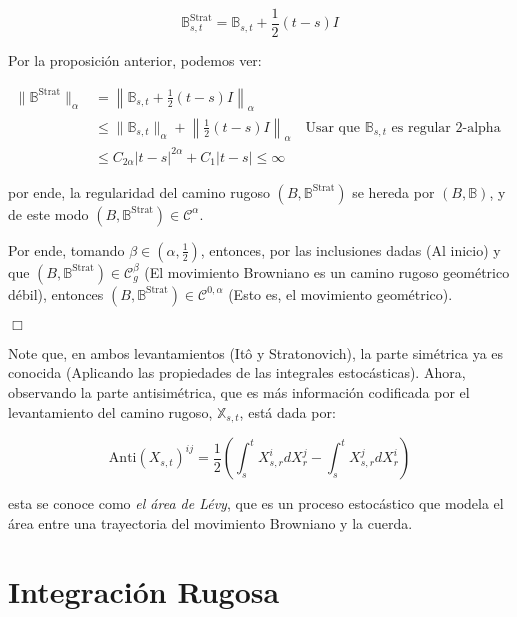 \[
	\mathbb{B}_{s,t}^{\text{Strat}} = \mathbb{B}_{s,t} + \frac{1}{2} (t - s) I
\]

Por la proposición anterior, podemos ver:

\begin{align*}
	\lVert  \mathbb{B}^{\text{Strat}} \rVert_{\alpha} &= \left\lVert \mathbb{B}_{s,t} + \frac{1}{2} (t - s) I \right\rVert_{ \alpha } \\
	&\leq \lVert \mathbb{B}_{s,t} \rVert_{\alpha} + \left\lVert \frac{1}{2}(t-s)I \right\rVert_{\alpha} \quad \text{Usar que } \mathbb{B}_{s,t} \text{ es regular 2-alpha } \\
	&\leq C_{2\alpha} \lvert t - s \rvert^{2\alpha} + C_{1} \lvert t - s \rvert \leq \infty
\end{align*}

por ende, la regularidad del camino rugoso $(B, \mathbb{B}^{\text{Strat}})$ se hereda por $(B, \mathbb{B})$, y de este modo $(B, \mathbb{B}^{\text{Strat}}) \in \mathcal{C}^{\alpha}$.

Por ende, tomando $\beta \in \left( \alpha, \frac{1}{2} \right)$, entonces, por las inclusiones dadas (Al inicio) y que $(B, \mathbb{B}^{\text{Strat}}) \in \mathcal{C}_g^{\beta}$ (El movimiento Browniano es un camino rugoso geométrico débil), entonces $(B, \mathbb{B}^{\text{Strat}}) \in \mathcal{C}^{0,\alpha}$ (Esto es, el movimiento geométrico).

\begin{flushright}
	$\Box$
\end{flushright}


Note que, en ambos levantamientos (Itô y Stratonovich), la parte simétrica ya es conocida (Aplicando las propiedades de las integrales estocásticas). Ahora, observando la parte antisimétrica, que es más información codificada por el levantamiento del camino rugoso, $\mathbb{X}_{s,t}$, está dada por:

\[
	\text{Anti}(X_{s,t})^{ij} = \frac{1}{2} \left( \int_s^t X_{s,r}^i dX_r^j - \int_s^t X_{s,r}^j dX^i_r \right)
\]

esta se conoce como \textit{el área de Lévy}, que es un proceso estocástico que modela el área entre una trayectoria del movimiento Browniano y la cuerda.




\section{Integración Rugosa}

